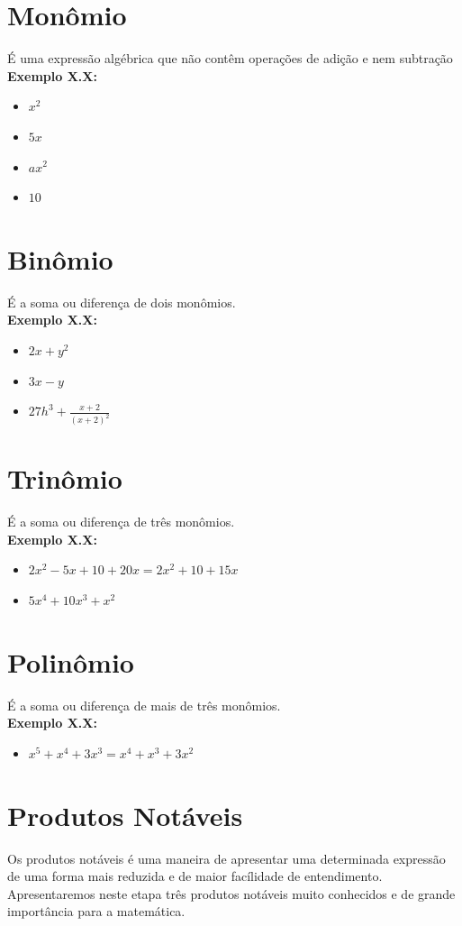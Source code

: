 \documentclass[a4paper,12pt,twoside,BCOR=10mm]{scrbook}
\begin{document}
\begin{titlepage}
\section{Monômio}
É uma expressão algébrica que não contêm operações de adição e nem subtração
\\
\textbf{Exemplo X.X:}
\begin{itemize}
\item $x^{2}$
\item $5x$
\item $ax^{2}$
\item $10$
\end{itemize}

\section{Binômio}
É a soma ou diferença de dois monômios.
\\
\textbf{Exemplo X.X:}
\begin{itemize}
\item $2x + y^{2}$
\item $3x - y$
\item $27h^{3}+ \frac{x + 2}{(x+2)^{2}}$
\end{itemize}


\section{Trinômio}
É a soma ou diferença de três monômios.
\\
\textbf{Exemplo X.X:}
\begin{itemize}
\item $2x^{2} - 5x + 10 + 20x = 2x^{2} + 10 + 15x$
\item $5x^{4} + 10x^{3} + x^{2}$
\end{itemize}


\section{Polinômio}
É a soma ou diferença de mais de três monômios.
\\
\textbf{Exemplo X.X:}
\begin{itemize}
\item $x^{5} + x^{4} + 3x^{3} = x^{4} + x^{3} + 3x^{2} $
\end{itemize}

\section{Produtos Notáveis}
Os produtos notáveis é uma maneira de apresentar uma determinada expressão de uma forma mais reduzida e de maior facílidade de entendimento. Apresentaremos neste etapa três produtos notáveis muito conhecidos e de grande importância para a matemática.


\end{titlepage}
\end{document}
